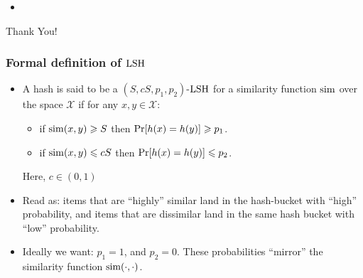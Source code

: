 \documentclass{beamer}
\begin{document}
\begin{frame}
\frametitle{}
\begin{itemize}
\item 
\end{itemize}
\end{frame}

\begin{frame}
\begin{center}
Thank You!
\end{center}
\end{frame}

\begin{frame}
\frametitle{Formal definition of $\mathrm{LSH}$}
\begin{itemize}
\item A hash is said to be a $(S, cS, p_1, p_2)$-$\mathrm{LSH}$ for a similarity function $\mathrm{sim}$ over the space 
$\mathcal{X}$ if for any $x, y\in\mathcal{X}$:
\begin{itemize}
\item if $\mathrm{sim}(x, y)\geqslant S$ then $\Pr[h(x)=h(y)]\geqslant p_1$.
\item if $\mathrm{sim}(x, y)\leqslant cS$ then $\Pr[h(x)=h(y)]\leqslant p_2$.
\end{itemize}
Here, $c \in (0, 1)$ \pause
\item Read as: items that are ``highly'' similar land in the  hash-bucket with ``high'' probability, and items that are dissimilar land in the same hash bucket with ``low'' probability.
\item Ideally we want: $p_1 = 1$, and $p_2 = 0$. These probabilities ``mirror'' the similarity function $\mathrm{sim}(\cdot, \cdot)$.
\end{itemize}
\end{frame}
\end{document}
